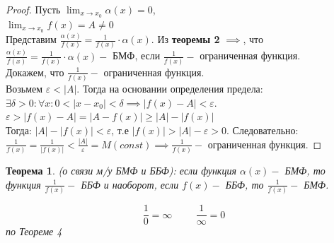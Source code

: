 \documentclass[12pt, a4paper]{article}
\newtheorem{theorem}{Теорема}[subsection]
\theoremstyle{remark}
\newcommand{\Y}{\mathbb{\forall}}
\newcommand{\F}{\mathbb{\exists}}
\newcommand{\E}{\mathbb{\varepsilon}}
\begin{document}
	\begin{proof}
		Пусть \(\lim_{x \to x_0} \alpha(x) = 0\), \\
		
		\(\lim_{x \to x_0} f(x) = A \neq 0\) \\
		
		Представим \(\frac{\alpha(x)}{f(x)} = \frac{1}{f(x)} \cdot \alpha(x)\). Из \textbf{теоремы 2} $\implies$, что $\frac{\alpha(x)}{f(x)} = \frac{1}{f(x)} \cdot \alpha(x) -$ БМФ, если $\frac{1}{f(x)} -$ ограниченная функция. \\
		
		Докажем, что $\frac{1}{f(x)} -$ ограниченная функция. \\
		
		Возьмем $\E < |A|$. Тогда на основании определения предела: \\
		
		$\F\delta > 0: \Y x: 0 < |x - x_0| < \delta \implies |f(x) - A| < \E$. \\
		
		$\E > |f(x) - A| = |A - f(x)| \geq |A| - |f(x)|$ \\
		
		Тогда: $|A| - |f(x)| < \E$, т.е $|f(x)| > |A| - \E > 0$. Следовательно: \(\frac{1}{f(x)} = \frac{1}{|f(x)|} < \frac{|A|}{\E} = M (const) \implies \frac{1}{f(x)} -\) ограниченная функция.
	\end{proof}
	
	\begin{theorem}
		(о связи м/у БМФ и ББФ): если функция $\alpha(x) -$ БМФ, то функция $\frac{1}{f(x)} -$ ББФ и наоборот, если $f(x) -$ ББФ, то $\frac{1}{f(x)} -$ БМФ. 
	\end{theorem}
	
	\begin{tcolorbox}[colframe=red!70!black, colback=white, boxrule=1pt, arc=3pt, width=\textwidth]
		\centering
		\large
		\[
		\frac{1}{0} = \infty \hspace{1cm} \frac{1}{\infty} = 0
		\]
		\normalsize \textit{по Теореме 4}
	\end{tcolorbox}
	
\end{document}
